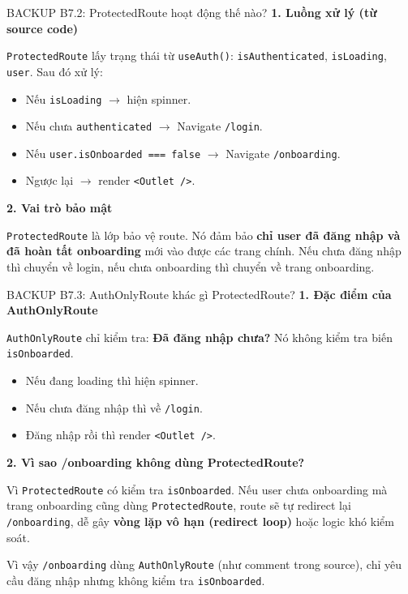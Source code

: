\documentclass[10pt, aspectratio=169]{beamer}
\begin{document}
\begin{frame}[fragile, label=b7_2]{BACKUP B7.2: ProtectedRoute hoạt động thế nào?}
\hypertarget{b7_2_target}{}
    \textbf{1. Luồng xử lý (từ source code)}
    \vspace{0.1cm}
    
    \texttt{ProtectedRoute} lấy trạng thái từ \texttt{useAuth()}: \texttt{isAuthenticated}, \texttt{isLoading}, \texttt{user}. Sau đó xử lý:
    
    \begin{itemize}
        \item Nếu \texttt{isLoading} $\rightarrow$ hiện spinner.
        \item Nếu chưa \texttt{authenticated} $\rightarrow$ Navigate \texttt{/login}.
        \item Nếu \texttt{user.isOnboarded === false} $\rightarrow$ Navigate \texttt{/onboarding}.
        \item Ngược lại $\rightarrow$ render \texttt{<Outlet />}.
    \end{itemize}

    \vspace{0.2cm}
    \textbf{2. Vai trò bảo mật}
    \vspace{0.1cm}
    
    \texttt{ProtectedRoute} là lớp bảo vệ route. Nó đảm bảo \textbf{chỉ user đã đăng nhập và đã hoàn tất onboarding} mới vào được các trang chính. Nếu chưa đăng nhập thì chuyển về login, nếu chưa onboarding thì chuyển về trang onboarding.
\end{frame}

\begin{frame}[fragile, label=b7_3]{BACKUP B7.3: AuthOnlyRoute khác gì ProtectedRoute?}
\hypertarget{b7_3_target}{}
    \textbf{1. Đặc điểm của AuthOnlyRoute}
    \vspace{0.1cm}
    
    \texttt{AuthOnlyRoute} chỉ kiểm tra: \textbf{Đã đăng nhập chưa?} Nó không kiểm tra biến \texttt{isOnboarded}.
    
    \begin{itemize}
        \item Nếu đang loading thì hiện spinner.
        \item Nếu chưa đăng nhập thì về \texttt{/login}.
        \item Đăng nhập rồi thì render \texttt{<Outlet />}.
    \end{itemize}

    \vspace{0.2cm}
    \textbf{2. Vì sao /onboarding không dùng ProtectedRoute?}
    \vspace{0.1cm}
    
    Vì \texttt{ProtectedRoute} có kiểm tra \texttt{isOnboarded}. Nếu user chưa onboarding mà trang onboarding cũng dùng \texttt{ProtectedRoute}, route sẽ tự redirect lại \texttt{/onboarding}, dễ gây \textbf{vòng lặp vô hạn (redirect loop)} hoặc logic khó kiểm soát. 
    
    Vì vậy \texttt{/onboarding} dùng \texttt{AuthOnlyRoute} (như comment trong source), chỉ yêu cầu đăng nhập nhưng không kiểm tra \texttt{isOnboarded}.
\end{frame}
\end{document}
